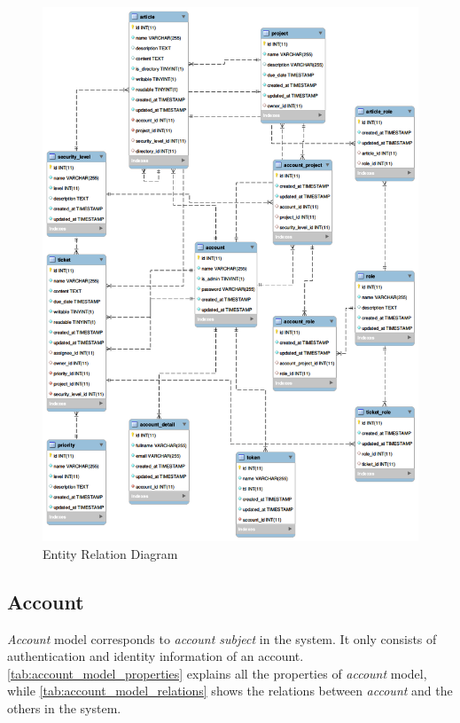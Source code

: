 \begin{figure}[bth]                                                                                                                                                  
\myfloatalign
\includegraphics[width=1.0\linewidth]{gfx/chapter_4/er_diagram}
\caption[Entity Relation Diagram]{Entity Relation Diagram}
\label{fig:er_diagram}
\end{figure}
\clearpage


\subsection{Account}

\emph{Account} model corresponds to \emph{account subject} in the system.
It only consists of authentication and identity information of an account.
\autoref{tab:account_model_properties} explains all the properties of \emph{account} model, while \autoref{tab:account_model_relations} shows the relations between \emph{account} and the others in the system.

